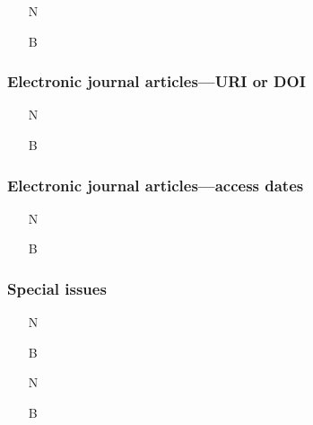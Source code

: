 \documentclass[11pt,letterpaper,oneside]{article}
\begin{document}
\begin{itemize}
\item[N] 

\item[B] 
\end{itemize}


\setcounter{subsubsection}{183}
\subsubsection{Electronic journal articles---URI or DOI}

\begin{itemize}
\item[N] 

\item[B] 
\end{itemize}

\subsubsection{Electronic journal articles---access dates}

\begin{itemize}
\item[N] 

\item[B] 
\end{itemize}

\setcounter{subsubsection}{186}
\subsubsection{Special issues}
\label{14.187}


\begin{itemize}
\item[N] 

\item[B] 

\item[N] 

\item[B] 
\end{itemize}
\end{document}
